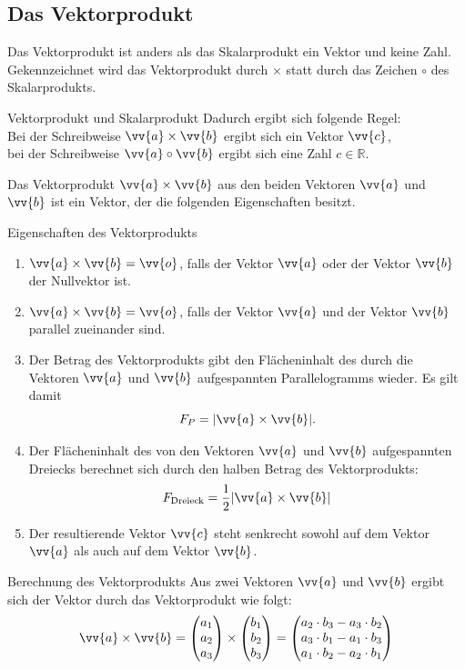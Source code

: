 \subsection{Das Vektorprodukt}
Das Vektorprodukt ist anders als das Skalarprodukt ein Vektor und keine Zahl. Gekennzeichnet wird das Vektorprodukt durch $\times$ statt durch das Zeichen $\circ$ des Skalarprodukts. \\
\begin{b8d*}{Vektorprodukt und Skalarprodukt}{}
Dadurch ergibt sich folgende Regel:\\
Bei der Schreibweise $\vv{a} \times\vv{b}$ ergibt sich ein Vektor $\vv{c}$,\\
bei der Schreibweise $\vv{a} \circ \vv{b}$ ergibt sich eine Zahl $c\in \mathds{R}$.
\end{b8d*}
Das Vektorprodukt $\vv{a} \times \vv{b}$ aus den beiden Vektoren $\vv{a}$ und $\vv{b}$ ist ein Vektor, der die folgenden Eigenschaften besitzt.
\begin{merke}{Eigenschaften des Vektorprodukts}{}
   \begin{enumerate}
       \item $\vv{a} \times \vv{b} = \vv{o}$, falls der Vektor $\vv{a}$ oder der Vektor $\vv{b}$ der Nullvektor ist.
       \item $\vv{a} \times \vv{b} = \vv{o}$, falls der Vektor $\vv{a}$ und der Vektor $\vv{b}$ parallel zueinander sind.
       \item Der Betrag des Vektorprodukts gibt den Flächeninhalt des durch die Vektoren $\vv{a} $ und $\vv{b}$ aufgespannten Parallelogramms wieder. Es gilt damit $$F_P=|\vv{a} \times \vv{b} |.$$
       \item Der Flächeninhalt des von den Vektoren $\vv{a}$ und $\vv{b}$ aufgespannten Dreiecks berechnet sich durch den halben Betrag des Vektorprodukts: $$F_{\text{Dreieck}} = \dfrac{1}{2} |\vv{a} \times \vv{b}|$$
       \item Der resultierende Vektor $\vv{c} $ steht senkrecht sowohl auf dem Vektor $\vv{a} $ als auch auf dem Vektor $\vv{b}$.
   \end{enumerate} 
\end{merke}
\begin{defi*}{Berechnung des Vektorprodukts}{}
Aus zwei Vektoren $\vv{a}$ und $\vv{b}$ ergibt sich der Vektor durch das Vektorprodukt wie folgt: $$\vv{a} \times \vv{b} = \begin{pmatrix} a_1 \\a_2\\a_3\end{pmatrix} \times \begin{pmatrix} b_1 \\b_2\\b_3\end{pmatrix} = \begin{pmatrix} a_2\cdot b_3 - a_3\cdot b_2 \\a_3\cdot b_1 - a_1\cdot b_3\\a_1\cdot b_2 - a_2\cdot b_1\end{pmatrix}$$
\end{defi*}
